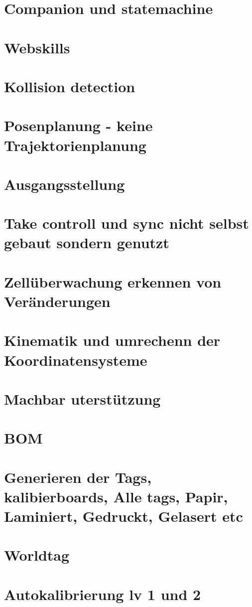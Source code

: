 \section{Companion und statemachine}
\section{Webskills}
\section{Kollision detection}
\section{Posenplanung - keine Trajektorienplanung}
\section{Ausgangsstellung}
\section{Take controll und sync nicht selbst gebaut sondern genutzt}
\section{Zellüberwachung erkennen von Veränderungen}
\section{Kinematik und umrechenn der Koordinatensysteme}
\section{Machbar uterstützung}
\section{BOM}
\section{Generieren der Tags, kalibierboards, Alle tags, Papir, Laminiert, Gedruckt, Gelasert etc}
\section{Worldtag}

\section{Autokalibrierung lv 1 und 2}
